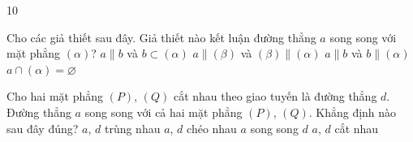 \begin{indapan}{10}
	\begin{ex}%
		Cho các giả thiết sau đây. Giả thiết nào kết luận đường thẳng $a$ song song với mặt phẳng $(\alpha)$?
		\choice
		{$a \parallel b$ và $b \subset (\alpha)$}
		{$a \parallel (\beta)$ và $(\beta) \parallel (\alpha)$}
		{$a \parallel b$ và $b \parallel (\alpha)$}
		{\True $a \cap (\alpha)=\varnothing$}
	\end{ex}

	\begin{ex}%
		Cho hai mặt phẳng $(P)$, $(Q)$ cắt nhau theo giao tuyến là đường thẳng $d$. Đường thẳng $a$ song song với cả hai mặt phẳng $(P)$, $(Q)$. Khẳng định nào sau đây đúng?
		\choice
		{$a$, $d$ trùng nhau}
		{$a$, $d$ chéo nhau}
		{\True $a$ song song $d$}
		{$a$, $d$ cắt nhau}
	\end{ex}


\end{indapan}
